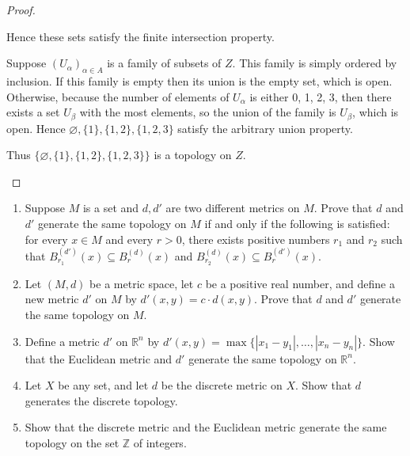 \begin{proof}
\begin{enumerate}[label={(\alph*)}]
		      Hence these sets satisfy the finite intersection property.

		      Suppose ${(U_{\alpha})}_{\alpha\in A}$ is a family of subsets of $Z$. This family is simply ordered by inclusion. If this family is empty then its union is the empty set, which is open. Otherwise, because the number of elements of $U_{\alpha}$ is either 0, 1, 2, 3, then there exists a set $U_{\beta}$ with the most elements, so the union of the family is $U_{\beta}$, which is open. Hence $\varnothing, \{1\}, \{1,2\}, \{1,2,3\}$ satisfy the arbitrary union property.

		      Thus $\{ \varnothing, \{1\}, \{1,2\}, \{1,2,3\} \}$ is a topology on $Z$.
	\end{enumerate}
\end{proof}

\begin{exercise}{2.4}
	\begin{enumerate}[label={(\alph*)}]
		\item Suppose $M$ is a set and $d, d'$ are two different metrics on $M$. Prove that $d$ and $d'$ generate the same topology on $M$ if and only if the following is satisfied: for every $x\in M$ and every $r > 0$, there exists positive numbers $r_{1}$ and $r_{2}$ such that $B^{(d')}_{r_{1}}(x)\subseteq B^{(d)}_{r}(x)$ and $B^{(d)}_{r_{2}}(x)\subseteq B^{(d')}_{r}(x)$.
		\item Let $(M, d)$ be a metric space, let $c$ be a positive real number, and define a new metric $d'$ on $M$ by $d'(x, y) = c\cdot d(x, y)$. Prove that $d$ and $d'$ generate the same topology on $M$.
		\item Define a metric $d'$ on $\mathbb{R}^{n}$ by $d'(x, y) = \max\{ \left\vert{x_{1} - y_{1}}\right\vert, \ldots, \left\vert{x_{n} - y_{n}}\right\vert \}$. Show that the Euclidean metric and $d'$ generate the same topology on $\mathbb{R}^{n}$.
		\item Let $X$ be any set, and let $d$ be the discrete metric on $X$. Show that $d$ generates the discrete topology.
		\item Show that the discrete metric and the Euclidean metric generate the same topology on the set $\mathbb{Z}$ of integers.
	\end{enumerate}
\end{exercise}

